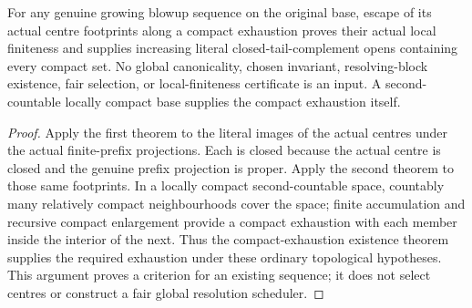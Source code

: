 \begin{theorem}
\label{hir:disjoint-actual-centre-exhaustion-escape}
\leanok
For any genuine growing blowup sequence on the original base, escape of its
actual centre footprints along a compact exhaustion proves their actual
local finiteness and supplies increasing literal closed-tail-complement opens
containing every compact set. No global canonicality, chosen invariant,
resolving-block existence, fair selection, or local-finiteness certificate is
an input. A second-countable locally compact base supplies the compact
exhaustion itself.
\end{theorem}
\begin{proof}
Apply the first theorem to the literal images of the actual centres under
the actual finite-prefix projections. Each is closed because the actual
centre is closed and the genuine prefix projection is proper. Apply the
second theorem to those same footprints. In a locally compact second-countable
space, countably many relatively compact neighbourhoods cover the space;
finite accumulation and recursive compact enlargement provide a compact
exhaustion with each member inside the interior of the next. Thus the
compact-exhaustion existence theorem supplies the required exhaustion under
these ordinary topological hypotheses. This argument proves a criterion for
an existing sequence; it does not select centres or construct a fair global
resolution scheduler.
\end{proof}
